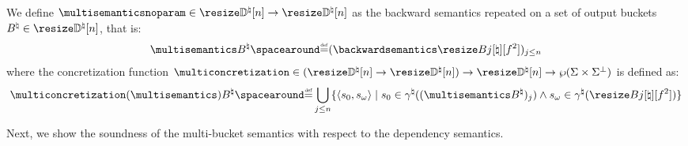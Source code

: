 \begin{definition}
  We define
$\multisemanticsnoparam\in\multitype$ as the backward semantics repeated on a set of output buckets $\buckets\in\vectorbuckets$, that is:
\begin{align*}
\multisemantics\buckets \DefeQ (\backwardsemantics\bucket)_{j\le n}
\end{align*}
where the concretization function $\multiconcretization\in(\multitype)\to\vectorbuckets\to\setof\pairofstates$ is defined as:
\begin{align*}\multiconcretization(\multisemantics)\buckets \DefeQ \bigsetjoin_{j\le n} \setdef{\inputoutputtuple{\defstate}}{\retrieveinput{\defstate}\in\abstractdomainconcretization((\multisemantics\buckets)_j)\land\retrieveoutput{\defstate}\in\abstractdomainconcretization(\bucket)}
\end{align*}
\end{definition}

Next, we show the soundness of the multi-bucket semantics with respect to the dependency semantics.

